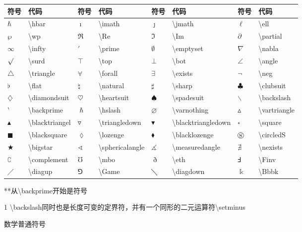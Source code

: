 \documentclass[UTF8,fontset=ubuntu]{ctexbook}
\begin{document}
\begin{threeparttable}
\begin{tabular}{l l l l l l l l}
	\hline
	符号 & 代码 & 符号 & 代码 & 符号 & 代码 & 符号 & 代码\\
	\hline
	$\hbar$ & \textbackslash hbar & $\imath$ & \textbackslash imath & $\jmath$ & \textbackslash jmath & $\ell$ & \textbackslash ell\\
	$\wp$ & \textbackslash wp & $\Re$ & \textbackslash Re & $\Im$ & \textbackslash Im & $\partial$ & \textbackslash partial\\
	$\infty$ & \textbackslash infty & $\prime$ & \textbackslash prime & $\emptyset$ & \textbackslash emptyset & $\nabla$ & \textbackslash nabla\\
	$\surd$ & \textbackslash surd & $\top$ & \textbackslash top & $\bot$ & \textbackslash bot & $\angle$ & \textbackslash angle\\
	$\triangle$ & \textbackslash triangle & $\forall$ & \textbackslash forall & $\exists$ & \textbackslash exists & $\neg$ & \textbackslash neg\\
	$\flat$ & \textbackslash flat & $\natural$ & \textbackslash natural & $\sharp$ & \textbackslash sharp & $\clubsuit$ & \textbackslash clubsuit\\
	$\diamondsuit$ & \textbackslash diamondsuit & $\heartsuit$ & \textbackslash heartsuit & $\spadesuit$ & \textbackslash spadesuit & $\backslash$ & \textbackslash backslash\tnote{1}\\
	$\backprime$ & \textbackslash backprime & $\hslash$ & \textbackslash hslash & $\varnothing$ & \textbackslash varnothing & $\vartriangle$ & \textbackslash vartriangle\\
	$\blacktriangle$ & \textbackslash blacktriangel & $\triangledown$ & \textbackslash triangledown & $\blacktriangledown$ & \textbackslash blacktriangledown & $\square$ & \textbackslash square\\
	$\blacksquare$ & \textbackslash blacksquare & $\lozenge$ & \textbackslash lozenge & $\blacklozenge$ & \textbackslash blacklozenge & $\circledS$ & \textbackslash circledS\\
	$\bigstar$ & \textbackslash bigstar & $\sphericalangle$ & \textbackslash sphericalangle & $\measuredangle$ & \textbackslash measuredangle & $\nexists$ & \textbackslash nexists\\
	$\complement$ & \textbackslash complement & $\mho$ & \textbackslash mbo & $\eth$ & \textbackslash eth & $\Finv$ & \textbackslash Finv\\
	$\diagup$ & \textbackslash diagup & $\Game$ & \textbackslash Game & $\diagdown$ & \textbackslash diagdown & $\Bbbk$ & \textbackslash Bbbk\\
	\hline
\end{tabular}
**从\textbackslash backprime开始是\AMS 符号
\begin{tablenotes}
	\item[1] \textbackslash backslash同时也是长度可变的定界符，并有一个同形的二元运算符\textbackslash setminus
\end{tablenotes}
\caption{数学普通符号}
\end{threeparttable}
\end{document}
